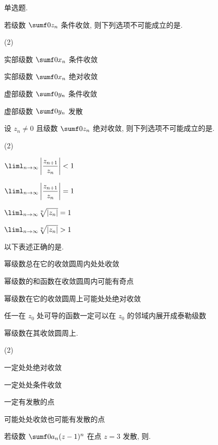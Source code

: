 \begin{homework}
  \item 单选题.
  \begin{homework}
    \item 若级数 $\sumf0 z_n$ 条件收敛, 则下列选项不可能成立的是\fillbrace{}.
      \begin{exchoice}(2)
        \item 实部级数 $\sumf0 x_n$ 条件收敛
        \item 实部级数 $\sumf0 x_n$ 绝对收敛
        \item 虚部级数 $\sumf0 y_n$ 条件收敛
        \item 虚部级数 $\sumf0 y_n$ 发散
      \end{exchoice}
    \item 设 $z_n\neq0$ 且级数 $\sumf0 z_n$ 绝对收敛, 则下列选项不可能成立的是\fillbrace{}.
      \begin{exchoice}(2)
        \item $\liml_{n\ra\infty}\abs{\dfrac{z_{n+1}}{z_n}}<1$
        \item $\liml_{n\ra\infty}\abs{\dfrac{z_{n+1}}{z_n}}=1$
        \item $\liml_{n\ra\infty}\sqrt[n]{|z_n|}=1$
        \item $\liml_{n\ra\infty}\sqrt[n]{|z_n|}>1$
      \end{exchoice}
    \item 以下表述正确的是\fillbrace{}.
      \begin{exchoice}
        \item 幂级数总在它的收敛圆周内处处收敛
        \item 幂级数的和函数在收敛圆周内可能有奇点
        \item 幂级数在它的收敛圆周上可能处处绝对收敛
        \item 任一在 $z_0$ 处可导的函数一定可以在 $z_0$ 的邻域内展开成泰勒级数
      \end{exchoice}
    \item 幂级数在其收敛圆周上\fillbrace{}.
      \begin{exchoice}(2)
        \item 一定处处绝对收敛
        \item 一定处处条件收敛
        \item 一定有发散的点
        \item 可能处处收敛也可能有发散的点
      \end{exchoice}
    \item 若级数 $\sumf0 a_n(z-1)^n$ 在点 $z=3$ 发散, 则\fillbrace{}.

\end{homework}
\end{homework}
